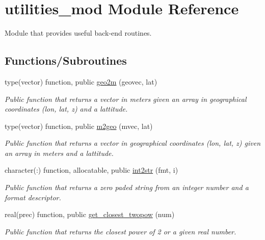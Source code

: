 \hypertarget{namespaceutilities__mod}{}\section{utilities\+\_\+mod Module Reference}
\label{namespaceutilities__mod}


Module that provides useful back-\/end routines.  


\subsection*{Functions/\+Subroutines}
\begin{DoxyCompactItemize}
\item 
type(vector) function, public \mbox{\hyperlink{namespaceutilities__mod_a415de70150d626b1e8c6e0c8c0e09e8b}{geo2m}} (geovec, lat)
\begin{DoxyCompactList}\small\item\em Public function that returns a vector in meters given an array in geographical coordinates (lon, lat, z) and a lattitude. \end{DoxyCompactList}\item 
type(vector) function, public \mbox{\hyperlink{namespaceutilities__mod_ac4f9ec7e3dc3683a4e79e462d89a90b9}{m2geo}} (mvec, lat)
\begin{DoxyCompactList}\small\item\em Public function that returns a vector in geographical coordinates (lon, lat, z) given an array in meters and a lattitude. \end{DoxyCompactList}\item 
character(\+:) function, allocatable, public \mbox{\hyperlink{namespaceutilities__mod_ab414aa8d1299fc8dfb5941113d050dd3}{int2str}} (fmt, i)
\begin{DoxyCompactList}\small\item\em Public function that returns a zero paded string from an integer number and a format descriptor. \end{DoxyCompactList}\item 
real(prec) function, public \mbox{\hyperlink{namespaceutilities__mod_a683f93677348e11d331c1c37c66caf7a}{get\+\_\+closest\+\_\+twopow}} (num)
\begin{DoxyCompactList}\small\item\em Public function that returns the closest power of 2 or a given real number. \end{DoxyCompactList}\end{DoxyCompactItemize}


